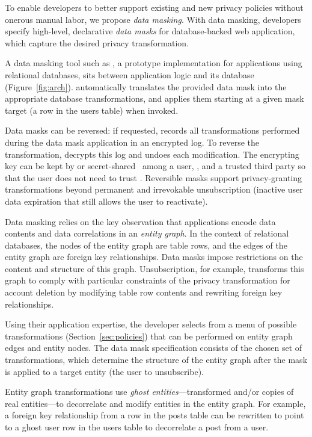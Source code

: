 To enable developers to better support existing and new privacy policies without onerous manual
labor, we propose \emph{data masking}.
%
With data masking, developers specify high-level, declarative \emph{data masks} for
database-backed web application, which capture the desired privacy transformation.

A data masking tool such as \sys, a prototype implementation for applications using relational
databases, sits between application logic and its database (Figure~\ref{fig:arch}).  \sys
automatically translates the provided data mask into the appropriate database transformations, and
applies them starting at a given mask target (\eg a row in the users table) when invoked.

Data masks can be reversed: if requested, \sys records all transformations performed during the data
mask application in an encrypted log. To reverse the transformation, \sys decrypts this log and
undoes each modification.
%
The encrypting key can be kept by \sys or secret-shared~\cite{secretsharing} among a user, \sys, and
a trusted third party so that the user does not need to trust \sys.  Reversible masks support
privacy-granting transformations beyond permanent and irrevokable unsubscription (\eg inactive user
data expiration that still allows the user to reactivate).

Data masking relies on the key observation that applications encode data contents and data
correlations in an \emph{entity graph}. In the context of relational databases, the nodes of the
entity graph are table rows, and the edges of the entity graph are foreign key relationships. Data
masks impose restrictions on the content and structure of this graph. Unsubscription, for example,
transforms this graph to comply with particular constraints of the privacy transformation for
account deletion by modifying table row contents and rewriting foreign key relationships.

Using their application expertise, the developer selects from a menu of possible transformations
(Section~\ref{sec:policies}) that can be performed on entity graph edges and entity nodes. 
The data mask specification consists of the chosen set of transformations, which determine the
structure of the entity graph after the mask is applied to a target entity (\eg the user to
unsubscribe).

Entity graph transformations use \emph{ghost entities}---transformed and/or copies of real
entities---to decorrelate and modify entities in the entity graph. For example, a foreign key
relationship from a row in the posts table can be rewritten to point to a ghost user row in the
users table to decorrelate a post from a user. 

